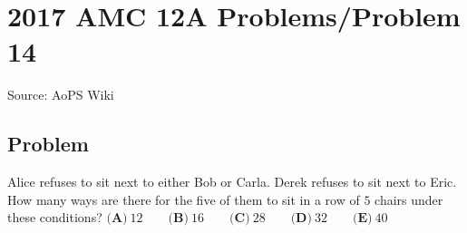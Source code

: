 \documentclass[12pt]{article}
\begin{document}
\section*{{2017 AMC 12A Problems/Problem 14}}
Source: AoPS Wiki

\subsection*{Problem}
Alice refuses to sit next to either Bob or Carla. Derek refuses to sit next to Eric. How many ways are there for the five of them to sit in a row of $5$ chairs under these conditions? $\textbf{(A)}\ 12 \qquad \textbf{(B)}\ 16 \qquad\textbf{(C)}\ 28 \qquad\textbf{(D)}\ 32 \qquad\textbf{(E)}\ 40$
\end{document}
